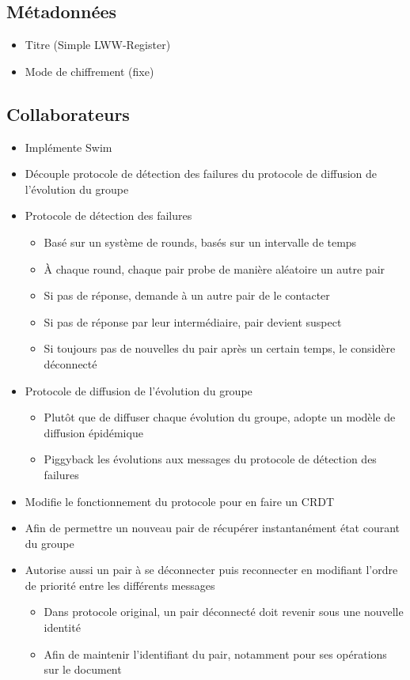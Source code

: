 \documentclass[12pt]{thesul}
\begin{document}
\subsection{Métadonnées}

\begin{itemize}
  \item Titre (Simple LWW-Register)
  \item Mode de chiffrement (fixe)
\end{itemize}

\subsection{Collaborateurs}

\begin{itemize}
  \item Implémente Swim \cite{swim2002}
  \item Découple protocole de détection des failures du protocole de diffusion de l'évolution du groupe
  \item Protocole de détection des failures
    \begin{itemize}
      \item Basé sur un système de rounds, basés sur un intervalle de temps
      \item À chaque round, chaque pair probe de manière aléatoire un autre pair
      \item Si pas de réponse, demande à un autre pair de le contacter
      \item Si pas de réponse par leur intermédiaire, pair devient suspect
      \item Si toujours pas de nouvelles du pair après un certain temps, le considère déconnecté
    \end{itemize}
  \item Protocole de diffusion de l'évolution du groupe
    \begin{itemize}
      \item Plutôt que de diffuser chaque évolution du groupe, adopte un modèle de diffusion épidémique
      \item Piggyback les évolutions aux messages du protocole de détection des failures
    \end{itemize}
  \item Modifie le fonctionnement du protocole pour en faire un CRDT
  \item Afin de permettre un nouveau pair de récupérer instantanément état courant du groupe
  \item Autorise aussi un pair à se déconnecter puis reconnecter en modifiant l'ordre de priorité entre les différents messages
  \begin{itemize}
    \item Dans protocole original, un pair déconnecté doit revenir sous une nouvelle identité
    \item Afin de maintenir l'identifiant du pair, notamment pour ses opérations sur le document
  \end{itemize}
\end{itemize}
\end{document}

